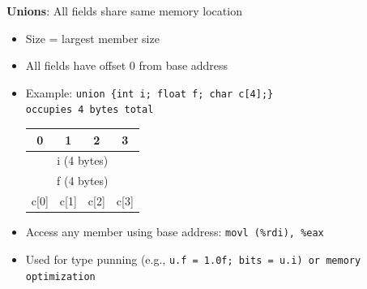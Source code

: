 \vspace{10pt}
\textbf{Unions}: All fields share same memory location
\begin{itemize}[noitemsep, topsep=1pt]
    \item Size = largest member size
    \item All fields have offset 0 from base address
    \item Example: \tt{union \{int i; float f; char c[4];\}} \\occupies 4 bytes total
      \begin{tabular}{|c|c|c|c|} \hline
        0 & 1 & 2 & 3 \\ \hline
        \multicolumn{4}{|c|}{i (4 bytes)} \\ \hline
        \multicolumn{4}{|c|}{f (4 bytes)} \\ \hline
        c[0] & c[1] & c[2] & c[3] \\ \hline
      \end{tabular}
    \item Access any member using base address: \tt{movl (\%rdi), \%eax}
    \item Used for type punning (e.g., \tt{u.f = 1.0f; bits = u.i}) or memory optimization
\end{itemize}